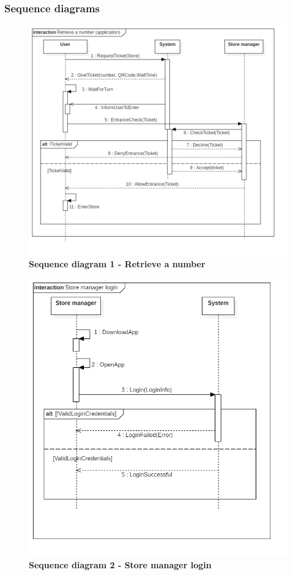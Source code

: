 \pagebreak
\pagebreak
\newpage
\FloatBarrier
\subsubsection{Sequence diagrams}

\begin{figure}[!htb]
\centering
\includegraphics[width=\textwidth]{Images/SequenceDiagram1_RetrieveANumber}
\caption{\label{fig:sequence1}\textbf{Sequence diagram 1 - Retrieve a number}}
\end{figure}

\pagebreak

\begin{figure}[!htb]
\centering
\includegraphics[width=\textwidth]{Images/SequenceDiagram2_StoreManagerLogin}
\caption{\label{fig:sequence2}\textbf{Sequence diagram 2 - Store manager login}}
\end{figure}

